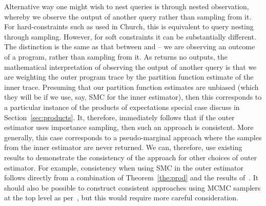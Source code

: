 Alternative way one might wish to nest queries is through nested observation, whereby we
observe the output of another query rather than sampling from it.  For hard-constraints such
as used in Church, this is equivalent to query nesting through sampling.  However, for soft
constraints it can be substantially different.  The distinction is the same as that between
\sample and \observe -- we are observing an outcome of a program, rather than sampling
from it.  As \observe returns no outputs, the mathematical interpretation of observing 
the output of another query is that we are weighting the outer program trace by the
partition function estimate of the inner trace.  Presuming that our partition function estimates
are unbiased (which they will be if we use, say, SMC for the inner estimator), then
this corresponds to a particular instance of the products of expectations special case
discuss in Section~\ref{sec:products}.  It, therefore, immediately follows that if
the outer estimator uses importance sampling, then such an approach is consistent.  More
generally, this case corresponds to a pseudo-marginal approach where the samples
from the inner estimator are never returned.  We can, therefore, use existing results
to demonstrate the consistency of the approach for other choices of outer estimator.
For example, consistency when using SMC in the outer estimator follows directly
from a combination of Theorem~\ref{the:prod} and the results of~\cite{naessethLS2015nested}.
It should also be possible to construct consistent approaches using MCMC samplers
at the top level as per~\cite{andrieu2009pseudo}, but this would require more
careful consideration.

